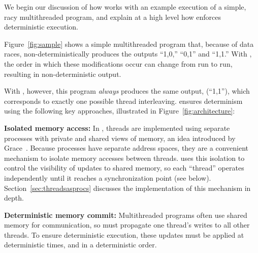 \begin{figure*}[!ht]
{\centering
\subfigure{}
\hspace{50pt}
\subfigure{}
\hspace{50pt}
\subfigure{}
\caption{A simple multithreaded program with data races on \texttt{a} and \texttt{b}. With \pthreads{}, the output is non-deterministic, but \dthreads{} guarantees the same output on every execution.\label{fig:sample}}
}
\end{figure*}

\label{sec:dthreads-overview}


We begin our discussion of how \dthreads{} works with an example execution of a
simple, racy multithreaded program, and explain at a high level how
\dthreads{} enforces deterministic execution.

Figure~\ref{fig:sample} shows a simple multithreaded program that,
because of data races, non-deterministically produces the outputs
``1,0,'' ``0,1'' and ``1,1.''  With \pthreads{}, the order in
which these modifications occur can change from run to run, resulting
in non-deterministic output. 

With \dthreads{}, however, this program \emph{always} produces the
same output, (``1,1''), which corresponds to exactly one possible
thread interleaving. \dthreads{} ensures determinism using the
following key approaches, illustrated in Figure~\ref{fig:architecture}:

\textbf{Isolated memory access:}
In \dthreads{}, threads are implemented using separate processes with
private and shared views of memory, an idea introduced by
Grace~\cite{grace}.  Because processes have separate address spaces,
they are a convenient mechanism to isolate memory accesses between
threads.  \dthreads{} uses this isolation to control the visibility of
updates to shared memory, so each ``thread'' operates independently
until it reaches a synchronization point (see
below). Section~\ref{sec:threadsasprocs} discusses the implementation
of this mechanism in depth.

\textbf{Deterministic memory commit:} 
Multithreaded programs often use shared memory for communication, so \dthreads{} must propagate one thread's writes to all other threads. To ensure deterministic
execution, these updates must be applied at deterministic times, and in a deterministic order.

